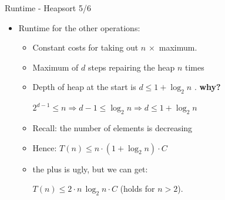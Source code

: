\documentclass{beamer}
\begin{document}

\begin{frame}{Runtime - Heapsort 5/6}
  \begin{itemize}
    \item 
      Runtime for the other operations: \quad{} \vspace*{-1em}
      \begin{itemize}
        \item<2->
          Constant costs for taking out $n \, \times$ maximum.
        \item<3->
          Maximum of $d$ steps repairing the heap $n$ times
        \item <4->
          Depth of heap at the start is $d \leq 1 + \log_2 n$ . \textcolor{Mittel-Gruen}{\textbf{why?}}
          \begin{center}
            \color{Mittel-Gruen} $2^{d-1} \leq n \Rightarrow d-1 \leq \log_2 n \Rightarrow d \leq 1 + \log_2 n$
          \end{center}
            \item<6->
              Recall: the number of elements is decreasing
        \item<7->
              Hence: 
              $T(n) \leq n \cdot (1 +\log_2 n) \cdot C$
            \item<8-> the plus is ugly, but we can get:
              \begin{center}
                $T(n) \leq 2 \cdot n \, \log_2 n \cdot C$ \qquad (holds for $n > 2$).
              \end{center}
          \end{itemize}
  \end{itemize}
\end{frame}

\end{document}
